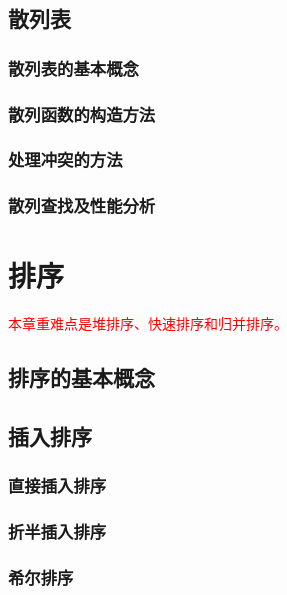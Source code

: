 \documentclass[12pt, a4paper, oneside]{ctexart}
\begin{document}
\subsection{散列表}

\subsubsection{散列表的基本概念}

\subsubsection{散列函数的构造方法}

\subsubsection{处理冲突的方法}

\subsubsection{散列查找及性能分析}

\section{排序}

\textcolor{red}{本章重难点是堆排序、快速排序和归并排序。}

\subsection{排序的基本概念}

\subsection{插入排序}

\subsubsection{直接插入排序}

\subsubsection{折半插入排序}

\subsubsection{希尔排序}
\end{document}
